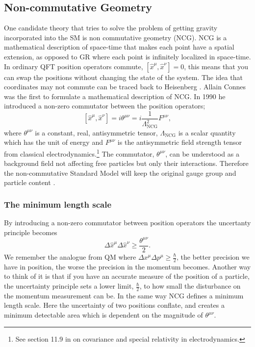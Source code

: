 \subsection{Non-commutative Geometry}
One candidate theory that tries to solve the problem of getting gravity incorporated into the SM is non commutative geometry (NCG). NCG is a mathematical description of space-time that makes each point have a spatial extension, as opposed to GR where each point is infinitely localized in space-time. In ordinary QFT position operators commute, $[ \hat x^{\mu}, \hat x^{\nu}] = 0$, this means that you can swap the positions without changing the state of the system. The idea that coordinates may not commute can be traced back to Heisenberg \cite{snyder1947qst}. Allain Connes \cite{connes1991pma} was the first to formulate a mathematical description of NCG. In 1990 he introduced a non-zero commutator between the position operators; \cite{rosendahl2008} 
\begin{equation} \label{eq:ncgtheta}
	[ \hat x^{\mu}, \hat x^{\nu}] = i \theta^{\mu \nu} = i \frac{1}{\Lambda_{\textrm{NCG}}^2} F^{\mu\nu},
\end{equation}
where $\theta^{\mu \nu}$ is a constant, real, antisymmetric tensor, $\Lambda_{\textrm{NCG}}$ is a scalar quantity which has the unit of energy and $F^{\mu\nu}$ is the antisymmetric field strength tensor from classical electrodynamics.\footnote{See section 11.9 in \cite{jackson1975cew} on covariance and special relativity in electrodynamics.} The commutator, $\theta^{\mu \nu}$, can be understood as a background field not affecting free particles but only their interactions. Therefore the non-commutative Standard Model will keep the original gauge group and particle content \cite{rosendahl2008}.

\subsubsection{The minimum length scale}
By introducing a non-zero commutator between position operators the uncertanty principle becomes
\begin{equation}
\Delta \hat x^{\mu} \Delta \hat x^{\nu} \ge \frac{\theta^{\mu \nu}}{2}.
\end{equation}
We remember the analogue from QM where $\Delta x^{\mu} \Delta p^{\mu} \ge \frac{\hbar}{2}$, the better precision we have in position, the worse the precision in the momentum becomes. Another way to think of it is that if you have an accurate measure of the position of a particle, the uncertainty principle sets a lower limit, $\frac{\hbar}{2}$, to how small the disturbance on the momentum measurement can be. In the same way NCG defines a minimum length scale. Here the uncertainty of two positions conflate, and creates a minimum detectable area which is dependent on the magnitude of $\theta^{\mu \nu}$.

